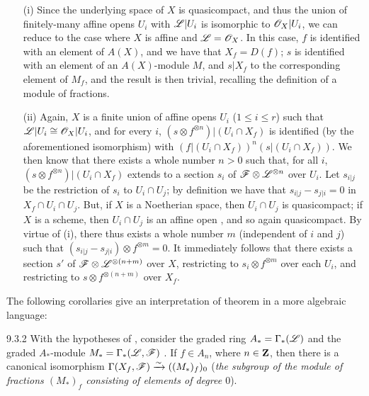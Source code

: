 \documentclass{book}
\begin{document}
\begin{itemize}
  \item[(i)] Since the underlying space of $X$ is quasicompact, and thus the union of
             finitely-many affine opens $U_i$ with $\mathscr{L}|U_i$ is isomorphic to
             $\mathscr{O}_X|U_i$, we can reduce to the case where $X$ is affine and $\mathscr{L}=\mathscr{O}_X$.
             In this case, $f$ is identified with an element of $A(X)$, and we have that
             $X_f=D(f)$; $s$ is identified with an element of an $A(X)$-module $M$, and
             $s|X_f$ to the corresponding element of $M_f$, and the result is then trivial,
             recalling the definition of a module of fractions.
  \item[(ii)] Again, $X$ is a finite union of affine opens $U_i$ ($1\leq i\leq r$)
              such that $\mathscr{L}|U_i\cong\mathscr{O}_X|U_i$, and for every $i$,
              $(s\otimes f^{\otimes n})|(U_i\cap X_f)$ is identified (by the aforementioned
              isomorphism) with $(f|(U_i\cap X_f))^n(s|(U_i\cap X_f))$. We then know 
              that there exists a whole number $n>0$ such that, for all $i$,
              $(s\otimes f^{\otimes n})|(U_i\cap X_f)$ extends to a section $s_i$ of
              $\mathscr{F}\otimes\mathscr{L}^{\otimes n}$ over $U_i$. Let $s_{i|j}$ be the
              restriction of $s_i$ to $U_i\cap U_j$; by definition we have that
              $s_{i|j}-s_{j|i}=0$ in $X_f\cap U_i\cap U_j$. But, if $X$ is a Noetherian
              space, then $U_i\cap U_j$ is quasicompact; if $X$ is a scheme, then $U_i\cap U_j$
              is an affine open , and so again quasicompact. By virtue of (i), there
              thus exists a whole number $m$ (independent of $i$ and $j$) such that
              $(s_{i|j}-s_{j|i})\otimes f^{\otimes m}=0$. It immediately follows that there
              exists a section $s'$ of $\mathscr{F}\otimes\mathscr{L}^{\otimes(n+m)}$ over $X$,
              restricting to $s_i\otimes f^{\otimes m}$ over each $U_i$, and restricting to
              $s\otimes f^{\otimes(n+m)}$ over $X_f$.
\end{itemize}

The following corollaries give an interpretation of theorem  in a more algebraic
language:

\begin{envs}[Corollary]{9.3.2}
\label{cor-1.9.3.2}
With the hypotheses of , consider the graded ring $A_\ast=\Gamma_\ast(\mathscr{L})$
and the graded $A_\ast$-module $M_\ast=\Gamma_\ast(\mathscr{L},\mathscr{F})$
. If $f\in A_n$, where $n\in\mathbf{Z}$, then there is
a canonical isomorphism $\Gamma(X_f,\mathscr{F})\xrightarrow{\sim}((M_\ast)_f)_0$
(\emph{the subgroup of the module of fractions $(M_\ast)_f$ consisting of elements of degree
$0$}).
\end{envs}
\end{document}
